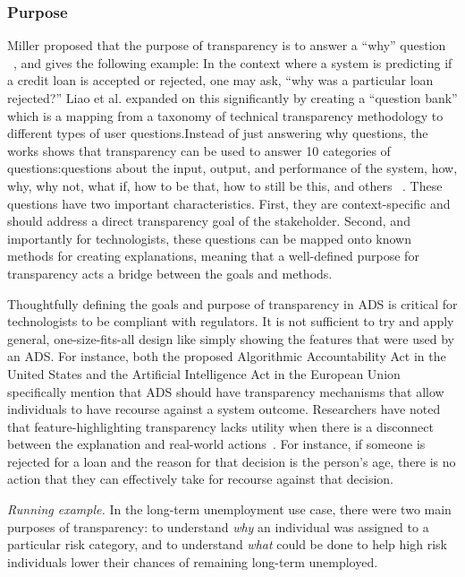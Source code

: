 \subsubsection{Purpose} \label{purpose}Miller proposed that the purpose of transparency is to answer a ``why'' question ~\cite{DBLP:journals/corr/Miller17a}, and gives the following example: In the context where a system is predicting if a credit loan is accepted or rejected, one may ask, ``why was a particular loan rejected?'' Liao et al. expanded on this significantly by creating a ``question bank'' which is a mapping from a taxonomy of technical transparency methodology to different types of user questions.Instead of just answering why questions, the works shows that transparency can be used to answer 10 categories of questions:questions about the input, output, and performance of the system, how, why, why not, what if, how to be that, how to still be this, and others ~\cite{DBLP:conf/chi/LiaoGM20}. These questions have two important characteristics. First, they are context-specific and should address a direct transparency goal of the stakeholder. Second, and importantly for technologists, these questions can be mapped onto known methods for creating explanations, meaning that a well-defined purpose for transparency acts a bridge between the goals and methods.

Thoughtfully defining the goals and purpose of transparency in ADS is critical for technologists to be compliant with regulators. It is not sufficient to try and apply general, one-size-fits-all design like simply showing the features that were used by an ADS. For instance, both the proposed Algorithmic Accountability Act in the United States and the Artificial Intelligence Act in the European Union specifically mention that ADS should have transparency mechanisms that allow individuals to have recourse against a system outcome. Researchers have noted that feature-highlighting transparency lacks utility when there is a disconnect between the explanation and real-world actions~\cite{barocas2020hidden}. For instance, if someone is rejected for a loan and the reason for that decision is the person's age, there is no action that they can effectively take for recourse against that decision.

\emph{Running example.} In the long-term unemployment use case, there were two main purposes of transparency: to understand \emph{why} an individual was assigned to a particular risk category, and to understand \emph{what} could be done to help high risk individuals lower their chances of remaining long-term unemployed.

